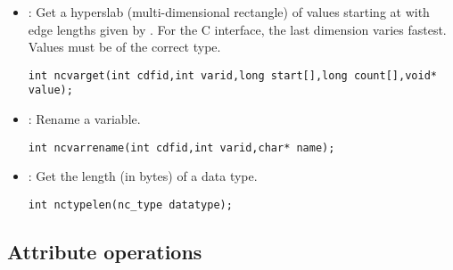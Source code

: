 \begin{itemize}
\item {} : Get a hyperslab (multi-dimensional rectangle) of
values starting at 
 with edge lengths given by . For the C
interface, the last dimension varies fastest. Values must be of the
correct type.
\begin{verbatim}
int ncvarget(int cdfid,int varid,long start[],long count[],void* value);
\end{verbatim}

\item {} : Rename a variable. 
\begin{verbatim}
int ncvarrename(int cdfid,int varid,char* name);
\end{verbatim}

\item {} : Get the length (in bytes) of a data type. 
\begin{verbatim}
int nctypelen(nc_type datatype);
\end{verbatim}

\end{itemize}

\subsection{Attribute operations}

